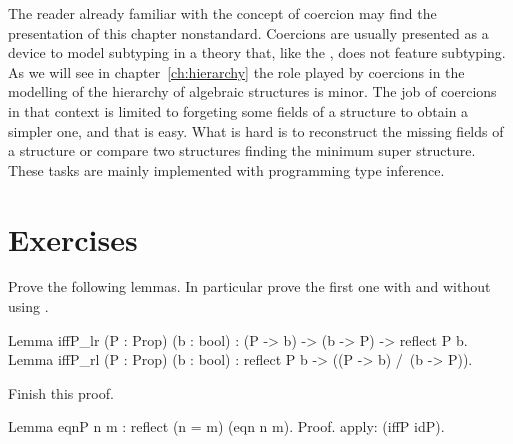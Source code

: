 %
%

The reader already familiar with the concept of coercion
may find the presentation of this chapter nonstandard.
Coercions are usually presented as a device to model
subtyping in a theory that, like the \mcbCIC{}, does not
feature subtyping.  As we will see in chapter~\ref{ch:hierarchy}
the role played by coercions in the modelling of the hierarchy
of algebraic structures is minor.  The job of
coercions in that context is limited to
forgeting some fields of a structure to obtain a simpler one, and
that is easy.  What
is hard is to reconstruct the missing fields of a structure
or compare two structures finding the minimum super structure.
These tasks are mainly implemented with programming type inference.


\section{Exercises}

\begin{Exercise}[label=ex:iffp,difficulty=0,title={reflect}]
Prove the following lemmas.  In particular prove the first
one with and without using .

\begin{coq}{}{}
Lemma iffP_lr (P : Prop) (b : bool) :
  (P -> b) -> (b -> P) -> reflect P b.
Lemma iffP_rl (P : Prop) (b : bool) :
  reflect P b -> ((P -> b) /\ (b -> P)).
\end{coq}
\end{Exercise}

\begin{Exercise}[label=ex:eqnP,difficulty=0,title={eqnP}]
Finish this proof.

\begin{coq}{}{}
Lemma eqnP n m : reflect (n = m) (eqn n m).
Proof.
apply: (iffP idP).
\end{coq}
\end{Exercise}


